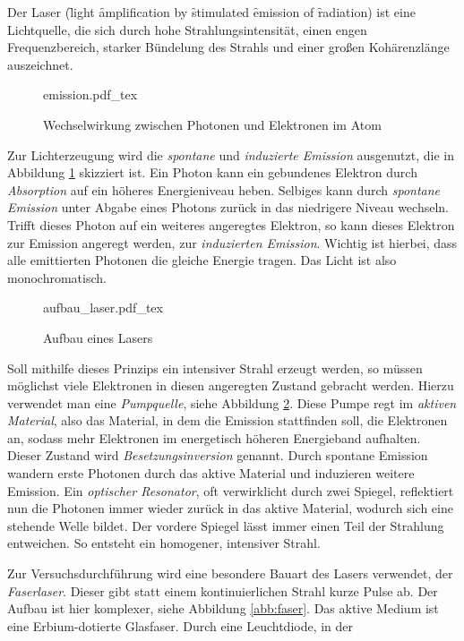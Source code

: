 Der Laser (\f light \f amplification by \f stimulated \f emission of \f radiation)
ist eine Lichtquelle, die sich durch hohe Strahlungsintensität, einen engen 
Frequenzbereich, starker Bündelung des Strahls und einer großen Kohärenzlänge 
auszeichnet. \par
\begin{figure}[h]
  \centering
  {emission.pdf_tex}
  \caption{Wechselwirkung zwischen Photonen und Elektronen im Atom}
  \label{abb:emission}
\end{figure}
Zur Lichterzeugung wird die \emph{spontane} und \emph{induzierte Emission} 
ausgenutzt, die in Abbildung \ref{abb:emission} skizziert ist. Ein Photon kann
ein gebundenes Elektron durch \emph{Absorption} auf ein höheres Energieniveau 
heben. Selbiges kann durch \emph{spontane Emission} unter Abgabe eines Photons
zurück in das niedrigere Niveau wechseln. Trifft dieses Photon auf ein weiteres
angeregtes Elektron, so kann dieses Elektron zur Emission angeregt werden, zur
\emph{induzierten Emission}. Wichtig ist hierbei, dass alle emittierten Photonen
die gleiche Energie tragen. Das Licht ist also monochromatisch. \par
\begin{figure}
  \centering
  {aufbau_laser.pdf_tex}
  \caption{Aufbau eines Lasers}
  \label{abb:aufbau_laser}
\end{figure}
Soll mithilfe dieses Prinzips ein intensiver Strahl erzeugt werden, so müssen 
möglichst viele Elektronen in diesen angeregten Zustand gebracht werden. Hierzu
verwendet man eine \emph{Pumpquelle}, siehe Abbildung \ref{abb:aufbau_laser}.
Diese Pumpe regt im \emph{aktiven Material},
also das Material, in dem die Emission stattfinden soll, die Elektronen an, sodass
mehr Elektronen im energetisch höheren Energieband aufhalten. Dieser Zustand wird
\emph{Besetzungsinversion} genannt. Durch spontane Emission wandern erste Photonen
durch das aktive Material und induzieren weitere Emission. 
Ein \emph{optischer Resonator}, oft verwirklicht durch zwei Spiegel, reflektiert nun
die Photonen immer wieder zurück in das aktive Material, wodurch sich eine stehende
Welle bildet. Der vordere Spiegel lässt immer einen Teil der Strahlung entweichen.
So entsteht ein homogener, intensiver Strahl. \par
Zur Versuchsdurchführung wird eine besondere Bauart des Lasers verwendet, der 
\emph{Faserlaser}. Dieser gibt statt einem kontinuierlichen Strahl kurze Pulse ab.
Der Aufbau ist hier komplexer, siehe Abbildung \ref{abb:faser}.
Das aktive Medium ist eine Erbium-dotierte Glasfaser. Durch eine Leuchtdiode, in der
